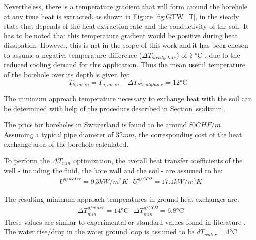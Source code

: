 \documentclass{article}
\begin{document}
Nevertheless, there is a temperature gradient that will form around the borehole at any time heat is extracted, as shown in Figure \ref{fig:GTW_T}, in the steady state that depends of the heat extraction rate and the conductivity of the soil. It has to be noted that this temperature gradient would be positive during heat dissipation. However, this is not in the scope of this work and it has been chosen to assume a negative temperature difference ($\Delta T_{steady state}$) of 3 \si{\celsius} \cite{guoTechnoeconomicComparisonDirect2012,hanSensitivityAnalysisVertical2016}, due to the reduced cooling demand for this application.
Thus the mean useful temperature of the borehole over its depth is given by:
\begin{equation}
	T_{b, mean} = T_{g, mean} -\Delta T_{Steady State} = 12 \si{\celsius}
\end{equation}

The minimum approach temperature necessary to exchange heat with the soil can be determined with help of the procedure described in Section \ref{ss:dtmin}. 

The price for boreholes in Switzerland is found to be around $80 CHF/m$ \cite{bawos.chMitErdsondenbohrungenKosten2018}. 
Assuming a typical pipe diameter of $32 mm$\cite{siaSIA384Sondes2010, kruseStatusDevelopmentResearcha}, the corresponding cost of the heat exchange area of the borehole calculated.

To perform the $\Delta T_{min}$ optimization, the overall heat transfer coefficients of the well - including the fluid, the bore wall and the soil - are assumed to be\cite{kruseStatusDevelopmentResearcha}:
\begin{align}
	& U^{g/water} = 9.3 kW/m^2K
	& U^{g/CO2} = 17.1 kW/m^2K
\end{align}

The resulting minimum approach temperatures in ground heat exchanges are:
\begin{align}
	&\Delta T_{min}^{g/water} = 14 \si{\celsius}
	&\Delta T_{min}^{g/CO2} = 6.8 \si{\celsius}
\end{align}
These values are similar to experimental or standard values found in literature \cite{siaSIA384Sondes2010, lamarcheReviewMethodsEvaluate2010}.\\

The water rise/drop in the water ground loop is assumed to be $dT_{water} = 4 \si{\celsius}$ \cite{lundDESIGNCLOSEDLOOPGEOTHERMAL}\\
\end{document}

